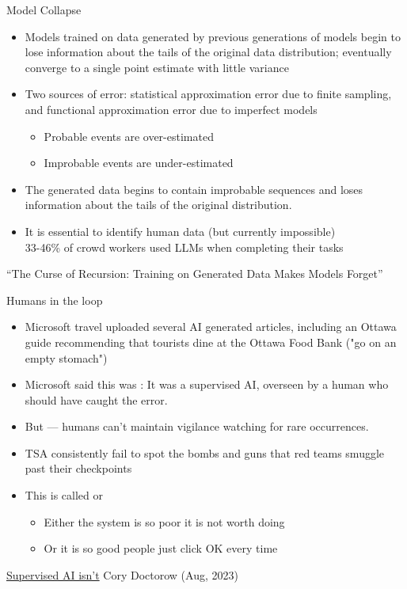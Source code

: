 \documentclass{beamer}
\begin{document}
\begin{frame}{Model Collapse}
\begin{itemize}%
\item Models trained on data generated by previous generations of
  models begin to lose information about the tails of the original
  data distribution;  eventually converge to a single point estimate
  with little variance
\item Two sources of error: statistical
  approximation error due to finite sampling, and functional
  approximation error due to imperfect models
  \begin{itemize}
  \item  Probable events are over-estimated 
  \item Improbable events are under-estimated 
  \end{itemize}
\item The generated data begins to contain improbable sequences and
  loses information about the tails of the original distribution.
\item It is essential to identify human data (but currently impossible)
  \\ 33-46\% of crowd workers used LLMs when completing their tasks
\end{itemize}
\citet{shumailov2023curse} ``The Curse of Recursion: Training on Generated Data Makes Models Forget''

\end{frame}

\begin{frame}{Humans in the loop}

\begin{itemize}
\item Microsoft travel uploaded several AI generated articles,
  including an Ottawa guide recommending that tourists dine
  at the Ottawa Food Bank ("go on an empty stomach")
\item Microsoft said this was : It was a supervised AI, overseen by a human who should have caught the error.
\item But --- humans can't maintain vigilance watching for rare occurrences.
\item TSA consistently fail to spot the bombs and guns that red teams
   smuggle past their checkpoints
 \item This is called  or 
   \begin{itemize}
   \item Either the system is so poor it is not worth doing
   \item Or it is so good people just click OK every time
   \end{itemize}
 \end{itemize}
\href{https://pluralistic.net/2023/08/23/automation-blindness/\#humans-in-the-loop}{Supervised AI isn't} Cory Doctorow (Aug, 2023)

\end{frame}
\end{document}
